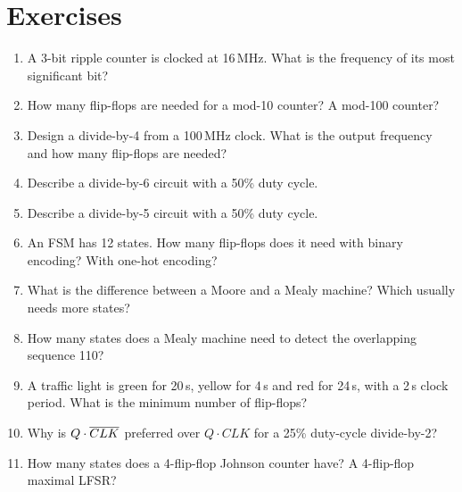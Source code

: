 \section{Exercises}

\begin{enumerate}
  \item A 3-bit ripple counter is clocked at 16\,MHz. What is the frequency of its most significant bit?
  \item How many flip-flops are needed for a mod-10 counter? A mod-100 counter?
  \item Design a divide-by-4 from a 100\,MHz clock. What is the output frequency and how many flip-flops are needed?
  \item Describe a divide-by-6 circuit with a 50\% duty cycle.
  \item Describe a divide-by-5 circuit with a 50\% duty cycle.
  \item An FSM has 12 states. How many flip-flops does it need with binary encoding? With one-hot encoding?
  \item What is the difference between a Moore and a Mealy machine? Which usually needs more states?
  \item How many states does a Mealy machine need to detect the overlapping sequence 110?
  \item A traffic light is green for 20\,s, yellow for 4\,s and red for 24\,s, with a 2\,s clock period. What is the minimum number of flip-flops?
  \item Why is $Q \cdot \overline{CLK}$ preferred over $Q \cdot CLK$ for a 25\% duty-cycle divide-by-2?
  \item How many states does a 4-flip-flop Johnson counter have? A 4-flip-flop maximal LFSR?
\end{enumerate}

